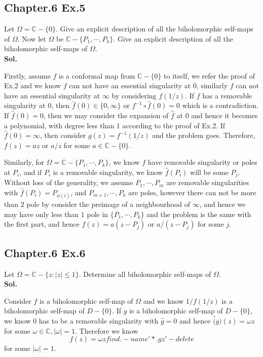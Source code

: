 \documentclass[lang=en,11pt,a4paper,citestyle =authoryear]{elegantpaper}
\newcommand{\C}{\mathbb{C}}
\begin{document}
\subsection*{Chapter.6 Ex.5} 
Let $\Omega = \C-\{0\}$. Give an explicit description of all the biholomorphic self-maps of $\Omega$. Now let $\Omega$ be $\C-\{P_1,\cdots,P_k\}$. Give an explicit description of all the biholomorphic self-maps of $\Omega$.
\vspace{0.5em}\\
\textbf{Sol.} \par
Firstly, assume $f$ is a conformal map from $\C-\{0\}$ to itself, we refer the proof of Ex.2 and we know $f$ can not have an essential singularity at $0$, similarly $f$ can not have an essential singularity at $\infty$ by considering $f(1/z)$. If $f$ has a removable singularity at $0$, then $\hat{f}(0) \in \{0,\infty\}$ or $f^{-1}\circ\hat{f}(0) = 0$ which is a contradiction. If $\hat{f}(0) = 0$, then we may consider the expansion of $\hat{f}$ at $0$ and hence it becomes a polynomial, with degree less than $1$ according to the proof of Ex.2. If $\hat{f}(0) = \infty$, then consider $g(z) = f^{-1}(1/z)$ and the problem goes. Therefore, $f(z) = az$ or $a/z$ for some $a\in\C-\{0\}$.\par
Similarly, for $\Omega = \C-\{P_1,\cdots,P_k\}$, we know $f$ have removable singularity or poles at $P_i$, and if $P_i$ is a removable singularity, we know $\hat{f}(P_i)$ will be some $P_j$. Without loss of the generality, we assume $P_1,\cdots,P_m$ are removable singularities with $\hat{f}(P_i) = P_{\phi(i)}$, and $P_{m+1},\cdots,P_k$ are poles, however there can not be more than $2$ pole by consider the preimage of a neighbourhood of $\infty$, and hence we may have only less than $1$ pole in $\{P_1,\cdots,P_k\}$ and the problem is the same with the first part, and hence $f(z) = a(z-P_j)$ or $a/(z-P_j)$ for some $j$.
\vspace{0.5em}

\subsection*{Chapter.6 Ex.6} 
Let $\Omega = \C-\{z:|z|\leq 1\}$. Determine all biholomorphic self-maps of $\Omega$.
\vspace{0.5em}\\
\textbf{Sol.} \par
Consider $f$ is a biholomorphic self-map of $\Omega$ and we know $1/f(1/z)$ is a biholomorphic self-map of $D-\{0\}$. If $g$ is a biholomorphic self-map of $D-\{0\}$, we know $0$ has to be a removable singularity with $\hat{g} = 0$ and hence $\hat(g)(z) = \omega z$ for some $\omega \in \C, |\omega| = 1$. Therefore we know
\[
f(z) = \omega zfind . -name '*.gz' -delete
\]
for some $|\omega| = 1$.
\vspace{0.5em}
\end{document}
